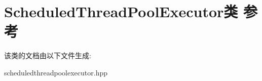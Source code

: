 \hypertarget{classScheduledThreadPoolExecutor}{}\section{Scheduled\+Thread\+Pool\+Executor类 参考}
\label{classScheduledThreadPoolExecutor}


该类的文档由以下文件生成\+:\begin{DoxyCompactItemize}
\item 
scheduledthreadpoolexecutor.\+hpp\end{DoxyCompactItemize}
